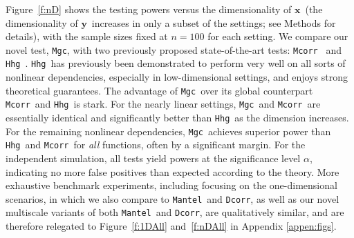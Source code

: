 \documentclass[11pt]{article}
\providecommand{\sct}[1]{{\sc \texttt{#1}}}
\providecommand{\mb}[1]{\boldsymbol{#1}}
\newcommand{\Mgc}{\sct{Mgc}}
\newcommand{\Mgcm}{\sct{Mgc$_M$}}
\newcommand{\Hhg}{\sct{Hhg}}
\newcommand{\Dcorr}{\sct{Dcorr}}
\newcommand{\Mcorr}{\sct{Mcorr}}
\newcommand{\Mantel}{\sct{Mantel}}
\newcommand{\mbx}{\ensuremath{\mb{x}}}
\newcommand{\mby}{\ensuremath{\mb{y}}}
\begin{document}




Figure~\ref{f:nD} shows the testing powers versus the dimensionality of \mbx~(the dimensionality of \mby~increases in only a subset of the settings; see Methods for details), with the sample sizes fixed at $n=100$ for each setting.  We compare  our novel test, \Mgc, with two previously proposed state-of-the-art tests: \Mcorr~\cite{SzekelyRizzo2013a} and \Hhg~\cite{HellerGorfine2013}.  \Hhg~has previously been demonstrated to perform very well on all sorts of nonlinear dependencies, especially in low-dimensional settings, and enjoys strong theoretical guarantees. 
% 
The advantage of \Mgc~over its global counterpart \Mcorr~and \Hhg~is  stark. For the nearly linear settings, \Mgc~and \Mcorr~are essentially identical and significantly better than \Hhg~as the dimension increases.  For the remaining nonlinear dependencies, \Mgc~achieves superior power than \Hhg~and \Mcorr~for \emph{all} functions, often by a significant margin.  For the independent simulation, all tests yield powers at the significance level $\alpha$,  indicating no more false positives than expected according to the theory.
More exhaustive benchmark experiments, including focusing on the one-dimensional scenarios,
in which we also compare to \Mantel~and \Dcorr, 
as well as our novel multiscale variants of both \Mantel~and \Dcorr, 
 are qualitatively similar, and are therefore relegated to Figure~\ref{f:1DAll} and~\ref{f:nDAll} in Appendix \ref{appen:figs}. 
\end{document}

